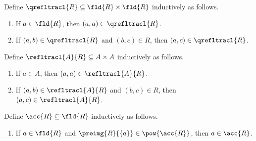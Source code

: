 \begin{inductive}\label{quasirefltracl}
    Define $\qrefltracl{R}\subseteq\fld{R}\times\fld{R}$ inductively as follows.
    \begin{enumerate}
        \item If $a\in\fld{R}$, then $(a,a)\in\qrefltracl{R}$.
        \item If $(a, b)\in\qrefltracl{R}$ and $(b,c)\in R$, then $(a,c)\in\qrefltracl{R}$.
    \end{enumerate}
\end{inductive}

\begin{inductive}\label{refltracl}
    Define $\refltracl{A}{R}\subseteq A\times A$ inductively as follows.
    \begin{enumerate}
        \item If $a\in A$, then $(a,a)\in\refltracl{A}{R}$.
        \item If $(a, b)\in\refltracl{A}{R}$ and $(b,c)\in R$, then $(a,c)\in\refltracl{A}{R}$.
    \end{enumerate}
\end{inductive}

\begin{inductive}\label{acc}
    Define $\acc{R}\subseteq \fld{R}$ inductively as follows.
    \begin{enumerate}
        \item If $a\in\fld{R}$ and $\preimg{R}{\{a\}}\in\pow{\acc{R}}$, then $a\in\acc{R}$.
    \end{enumerate}
\end{inductive}
